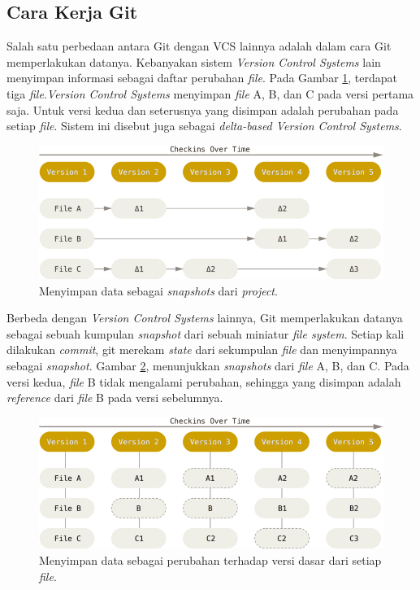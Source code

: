 \subsection{Cara Kerja Git}
\label{subsec:cara_kerja_git}
Salah satu perbedaan antara Git dengan VCS lainnya adalah dalam cara Git memperlakukan datanya. Kebanyakan sistem \textit{Version Control Systems} lain menyimpan informasi sebagai daftar perubahan \textit{file}. Pada Gambar \ref{fig:deltas}, terdapat tiga \textit{file}.\textit{Version Control Systems} menyimpan \textit{file} A, B, dan C pada versi pertama saja. Untuk versi kedua dan seterusnya yang disimpan adalah perubahan pada setiap \textit{file}. Sistem ini disebut juga sebagai \textit{delta-based Version Control Systems}. 
\begin{figure}[H]
	\centering
		\includegraphics[scale=0.5]{Gambar/deltas.png}
	\caption{Menyimpan data sebagai \textit{snapshots} dari \textit{project}\cite{chacon2014pro}.}
	\label{fig:deltas}
\end{figure}


Berbeda dengan \textit{Version Control Systems} lainnya, Git memperlakukan datanya sebagai sebuah kumpulan \textit{snapshot} dari sebuah miniatur \textit{file system}. Setiap kali dilakukan \textit{commit}, git merekam \textit{state} dari sekumpulan \textit{file} dan menyimpannya sebagai \textit{snapshot}. Gambar \ref{fig:snapshots}, menunjukkan \textit{snapshots} dari \textit{file} A, B, dan C. Pada versi kedua, \textit{file} B tidak mengalami perubahan, sehingga yang disimpan adalah \textit{reference} dari \textit{file} B pada versi sebelumnya.
\begin{figure}[H]
	\centering
		\includegraphics[scale=0.5]{Gambar/snapshots.png}
	\caption{Menyimpan data sebagai perubahan terhadap versi dasar dari setiap \textit{file}\cite{chacon2014pro}.}
	\label{fig:snapshots}
\end{figure}

